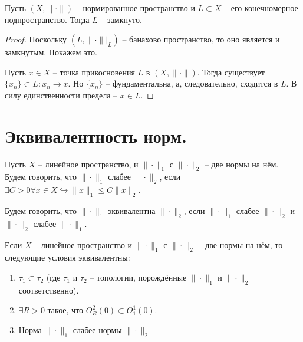 \begin{theorem}
    Пусть $(X, \|\cdot\|)$ -- нормированное пространство и $L \subset X$ -- его конечномерное подпространство.
    Тогда $L$ -- замкнуто.
\end{theorem}
\begin{proof}
    Поскольку $(L, \|\cdot\|\bigr|_{L})$ -- банахово пространство, то оно является и замкнутым.
    Покажем это.

    Пусть $x \in X$ -- точка прикосновения $L$ в $(X, \|\cdot\|)$.
    Тогда существует $\{x_n\} \subset L\colon x_n \rightarrow x$.
    Но $\{x_n\}$ -- фундаментальна, а, следовательно, сходится в $L$.
    В силу единственности предела -- $x \in L$.

\end{proof}
\section{Эквивалентность норм.}
\begin{definition}
    Пусть $X$ -- линейное пространство, и $\|\cdot\|_1$ с $\|\cdot\|_2$ -- две нормы на нём.
    Будем говорить, что $\|\cdot\|_1$ слабее $\|\cdot\|_2$, если $\exists C > 0 \forall x \in X \hookrightarrow \|x\|_1 \leq C\|x\|_2$.

    Будем говорить, что $\|\cdot\|_1$ эквивалентна $\|\cdot\|_2$, если $\|\cdot\|_1$ слабее $\|\cdot\|_2$ и $\|\cdot\|_2$ слабее $\|\cdot\|_1$.
\end{definition}
\begin{theorem}
    Если $X$ -- линейное пространство и $\|\cdot\|_1$ с $\|\cdot\|_2$ -- две нормы на нём, то следующие условия эквивалентны:
    \begin{enumerate}
        \item $\tau_1 \subset \tau_2$ (где $\tau_1$ и $\tau_2$ -- топологии, порождённые $\|\cdot\|_1$ и $\|\cdot\|_2$ соответственно).
        \item $\exists R > 0$ такое, что $O_R^2(0) \subset O_1^1(0)$.
        \item Норма $\|\cdot\|_1$ слабее нормы $\|\cdot\|_2$
    \end{enumerate}
\end{theorem}
